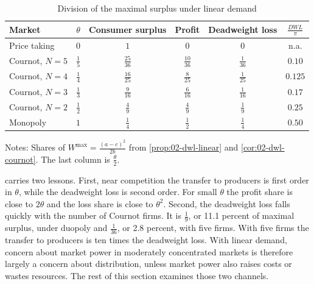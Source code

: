 \begin{table}[htbp]
\centering
\begin{threeparttable}
\caption{Division of the maximal surplus under linear demand}
\label{tab:02-welfare-shares}
\small
\renewcommand{\arraystretch}{1.6}
\begin{tabular}{@{}lccccc@{}}
\toprule
Market & $\theta$ & Consumer surplus & Profit & Deadweight loss & $\frac{\mathit{DWL}}{\pi}$ \\
\midrule
Price taking      & $0$           & $1$                & $0$               & $0$              & n.a. \\
Cournot, $N = 5$  & $\frac{1}{5}$ & $\frac{25}{36}$    & $\frac{10}{36}$   & $\frac{1}{36}$   & $0.10$ \\
Cournot, $N = 4$  & $\frac{1}{4}$ & $\frac{16}{25}$    & $\frac{8}{25}$    & $\frac{1}{25}$   & $0.125$ \\
Cournot, $N = 3$  & $\frac{1}{3}$ & $\frac{9}{16}$     & $\frac{6}{16}$    & $\frac{1}{16}$   & $0.17$ \\
Cournot, $N = 2$  & $\frac{1}{2}$ & $\frac{4}{9}$      & $\frac{4}{9}$     & $\frac{1}{9}$    & $0.25$ \\
Monopoly          & $1$           & $\frac{1}{4}$      & $\frac{1}{2}$     & $\frac{1}{4}$    & $0.50$ \\
\bottomrule
\end{tabular}
\begin{tablenotes}\footnotesize
\item Notes: Shares of $W^{\max} = \frac{(a - c)^2}{2b}$ from \cref{prop:02-dwl-linear} and
\cref{cor:02-dwl-cournot}. The last column is $\frac{\theta}{2}$.
\end{tablenotes}
\end{threeparttable}
\end{table}

 carries two lessons. First, near competition the transfer to producers is first order
in $\theta$, while the deadweight loss is second order. For small $\theta$ the profit share is close to $2\theta$ and
the loss share is close to $\theta^2$. Second, the deadweight loss falls quickly with the number of Cournot firms.
It is $\frac{1}{9}$, or 11.1 percent of maximal surplus, under duopoly and $\frac{1}{36}$, or 2.8 percent, with five
firms. With five firms the transfer to producers is ten times the deadweight loss. With linear demand, concern about
market power in moderately concentrated markets is therefore largely a concern about distribution, unless market power also
raises costs or wastes resources. The rest of this section examines those two channels.


